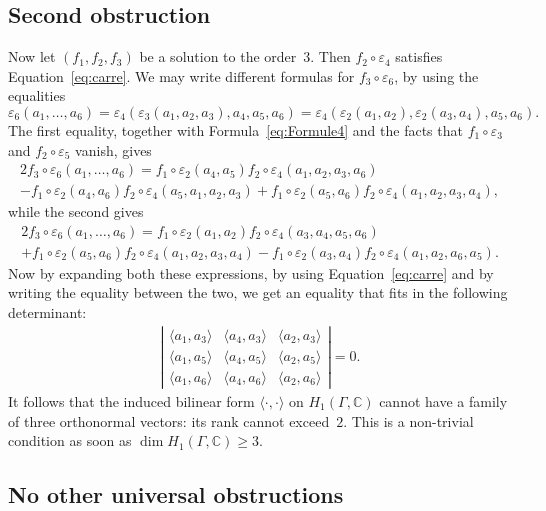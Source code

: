 \documentclass[JEP,XML,SOM,Unicode,NoEqCountersInSection]{cedram}
\theoremstyle{definition}
\newcommand{\CC}{\mathbb{C}}
\begin{document}
\subsection{Second obstruction}

Now let $(f_1,f_2,f_3)$ be a solution to the order~$3$. Then
$f_2\circ\varepsilon_4$ satisfies Equation~\eqref{eq:carre}. We may write
different formulas for $f_3\circ\varepsilon_6$, by using the equalities
\[ \varepsilon_6(a_1,\ldots,a_6)=\varepsilon_4(\varepsilon_3(a_1,a_2,a_3),
a_4,a_5,a_6)=\varepsilon_4(\varepsilon_2(a_1,a_2),\varepsilon_2(a_3,a_4),
a_5,a_6). \]
The first equality, together with Formula~\eqref{eq:Formule4} and the facts
that $f_1\circ\varepsilon_3$ and $f_2\circ\varepsilon_5$ vanish, gives
\begin{multline*}
2f_3\circ\varepsilon_6(a_1,\ldots,a_6)=f_1\circ\varepsilon_2(a_4,a_5)
f_2\circ\varepsilon_4(a_1,a_2,a_3,a_6)\\
-f_1\circ\varepsilon_2(a_4,a_6) f_2\circ\varepsilon_4(a_5,a_1,a_2,a_3)+f_1\circ\varepsilon_2(a_5,a_6)f_2\circ\varepsilon_4(a_1,a_2,a_3,a_4),
\end{multline*}
while the second gives
\begin{multline*}
2f_3\circ\varepsilon_6(a_1,\ldots,a_6)=f_1\circ\varepsilon_2(a_1,a_2)
f_2\circ\varepsilon_4(a_3,a_4,a_5,a_6)\\+f_1\circ\varepsilon_2(a_5,a_6)
f_2\circ\varepsilon_4(a_1,a_2,a_3,a_4)-f_1\circ\varepsilon_2(a_3,a_4)f_2\circ\varepsilon_4(a_1,a_2,a_6,a_5).
\end{multline*}
Now by expanding both these expressions, by using Equation~\eqref{eq:carre}
and by writing the equality between the two, we get an equality that fits
in the following determinant:
\begin{align*}
\left|\begin{array}{ccc}
\langle a_1,a_3\rangle & \langle a_4,a_3\rangle & \langle a_2,a_3\rangle \\
\langle a_1,a_5\rangle & \langle a_4,a_5\rangle & \langle a_2,a_5\rangle \\
\langle a_1,a_6\rangle & \langle a_4,a_6\rangle & \langle a_2,a_6\rangle
\end{array}\right|=0.
\end{align*}
It follows that the induced bilinear form $\langle\cdot,\cdot\rangle$ on
$H_1(\Gamma,\CC)$ cannot have a family of three orthonormal vectors: its
rank cannot exceed~$2$. This is a non-trivial condition as soon as
$\dim H_1(\Gamma,\CC)\geq 3$.

\subsection{No other universal obstructions}
\end{document}
